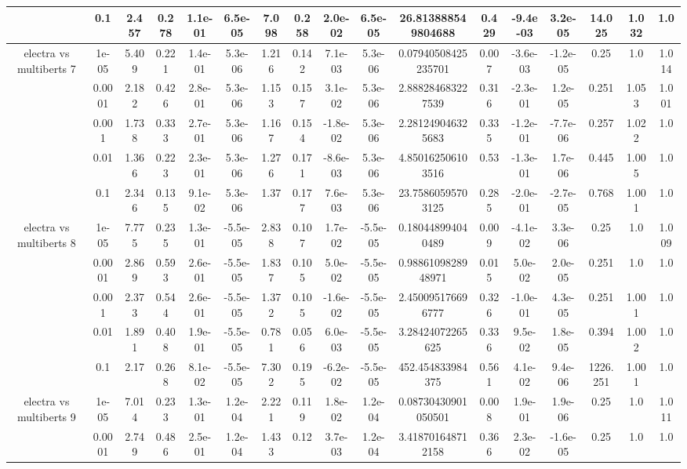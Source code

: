 \begin{tabular}{|c|c|c|c|c|c|c|c|c|c|c|c|c|c|c|c|c|}
 & 0.1 & 2.457 & 0.278 & 1.1e-01 & 6.5e-05 & 7.098 & 0.258 & 2.0e-02 & 6.5e-05 & 26.813888549804688 & 0.429 & -9.4e-03 & 3.2e-05 & 14.025 & 1.032 & 1.0 \\
\hline
\multirow{5}{*}{electra  vs multiberts 7} & 1e-05 & 5.409 & 0.221 & 1.4e-01 & 5.3e-06 & 1.216 & 0.142 & 7.1e-03 & 5.3e-06 & 0.07940508425235701 & 0.007 & -3.6e-03 & -1.2e-05 & 0.25 & 1.0 & 1.014 \\
 & 0.0001 & 2.182 & 0.426 & 2.8e-01 & 5.3e-06 & 1.153 & 0.157 & 3.1e-02 & 5.3e-06 & 2.888284683227539 & 0.316 & -2.3e-01 & 1.2e-05 & 0.251 & 1.053 & 1.001 \\
 & 0.001 & 1.738 & 0.333 & 2.7e-01 & 5.3e-06 & 1.167 & 0.154 & -1.8e-02 & 5.3e-06 & 2.281249046325683 & 0.335 & -1.2e-01 & -7.7e-06 & 0.257 & 1.022 & 1.0 \\
 & 0.01 & 1.366 & 0.223 & 2.3e-01 & 5.3e-06 & 1.276 & 0.171 & -8.6e-03 & 5.3e-06 & 4.850162506103516 & 0.53 & -1.3e-01 & 1.7e-06 & 0.445 & 1.005 & 1.0 \\
 & 0.1 & 2.346 & 0.135 & 9.1e-02 & 5.3e-06 & 1.37 & 0.177 & 7.6e-03 & 5.3e-06 & 23.75860595703125 & 0.285 & -2.0e-01 & -2.7e-05 & 0.768 & 1.001 & 1.0 \\
\hline
\multirow{5}{*}{electra  vs multiberts 8} & 1e-05 & 7.775 & 0.235 & 1.3e-01 & -5.5e-05 & 2.838 & 0.107 & 1.7e-02 & -5.5e-05 & 0.180448994040489 & 0.009 & -4.1e-02 & 3.3e-06 & 0.25 & 1.0 & 1.009 \\
 & 0.0001 & 2.869 & 0.593 & 2.6e-01 & -5.5e-05 & 1.837 & 0.105 & 5.0e-02 & -5.5e-05 & 0.9886109828948971 & 0.015 & 5.0e-02 & 2.0e-05 & 0.251 & 1.0 & 1.0 \\
 & 0.001 & 2.373 & 0.544 & 2.6e-01 & -5.5e-05 & 1.372 & 0.105 & -1.6e-02 & -5.5e-05 & 2.450095176696777 & 0.326 & -1.0e-01 & 4.3e-05 & 0.251 & 1.001 & 1.0 \\
 & 0.01 & 1.891 & 0.408 & 1.9e-01 & -5.5e-05 & 0.781 & 0.056 & 6.0e-03 & -5.5e-05 & 3.28424072265625 & 0.336 & 9.5e-02 & 1.8e-05 & 0.394 & 1.002 & 1.0 \\
 & 0.1 & 2.17 & 0.268 & 8.1e-02 & -5.5e-05 & 7.302 & 0.195 & -6.2e-02 & -5.5e-05 & 452.454833984375 & 0.561 & 4.1e-02 & 9.4e-06 & 1226.251 & 1.001 & 1.0 \\
\hline
\multirow{5}{*}{electra  vs multiberts 9} & 1e-05 & 7.014 & 0.233 & 1.3e-01 & 1.2e-04 & 2.221 & 0.119 & 1.8e-02 & 1.2e-04 & 0.08730430901050501 & 0.008 & 1.9e-01 & 1.9e-06 & 0.25 & 1.0 & 1.011 \\
 & 0.0001 & 2.749 & 0.486 & 2.5e-01 & 1.2e-04 & 1.433 & 0.12 & 3.7e-03 & 1.2e-04 & 3.418701648712158 & 0.366 & 2.3e-02 & -1.6e-05 & 0.25 & 1.0 & 1.0 \\

\end{tabular}
